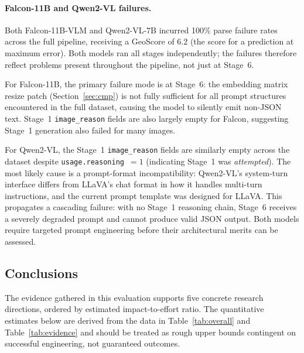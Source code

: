 \documentclass[11pt]{article}
\begin{document}
\paragraph{Falcon-11B and Qwen2-VL failures.}
\label{sec:failures}
Both Falcon-11B-VLM and Qwen2-VL-7B incurred 100\% parse failure rates across the
full pipeline, receiving a GeoScore of 6.2 (the score for a prediction at maximum
error). Both models ran all stages independently; the failures therefore reflect
problems present throughout the pipeline, not just at Stage~6.

For Falcon-11B, the primary failure mode is at Stage~6: the embedding matrix
resize patch (Section~\ref{sec:cmp}) is not fully sufficient for all prompt
structures encountered in the full dataset, causing the model to silently emit
non-JSON text. Stage~1 \texttt{image\_reason} fields are also largely empty for
Falcon, suggesting Stage~1 generation also failed for many images.

For Qwen2-VL, the Stage~1 \texttt{image\_reason} fields are similarly empty across
the dataset despite \texttt{usage.reasoning}~$= 1$ (indicating Stage~1 was
\emph{attempted}). The most likely cause is a prompt-format incompatibility:
Qwen2-VL's system-turn interface differs from LLaVA's chat format in how it
handles multi-turn instructions, and the current prompt template was designed for
LLaVA. This propagates a cascading failure: with no Stage~1 reasoning chain,
Stage~6 receives a severely degraded prompt and cannot produce valid JSON output.
Both models require targeted prompt engineering before their architectural merits
can be assessed.

\subsection{Conclusions}
\label{sec:conclusions}

The evidence gathered in this evaluation supports five concrete research directions,
ordered by estimated impact-to-effort ratio. The quantitative estimates below are
derived from the data in Table~\ref{tab:overall} and Table~\ref{tab:evidence} and
should be treated as rough upper bounds contingent on successful engineering, not
guaranteed outcomes.
\end{document}
